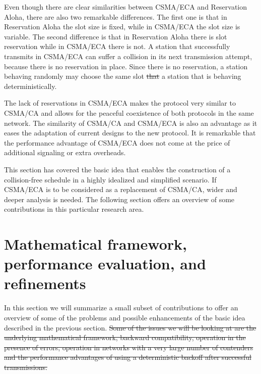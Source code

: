 \documentclass[journal]{IEEEtran}
\providecommand{\DIFadd}[1]{{\protect\color{blue}\uwave{#1}}} %
\providecommand{\DIFdel}[1]{{\protect\color{red}\sout{#1}}}                      %
\providecommand{\DIFaddbegin}{} %
\providecommand{\DIFaddend}{} %
\providecommand{\DIFdelbegin}{} %
\providecommand{\DIFdelend}{} %
\begin{document}

Even though there are clear similarities between CSMA/ECA and Reservation Aloha, there are also two remarkable differences.
The first one is that in Reservation Aloha the slot size is fixed, while in CSMA/ECA the slot size is variable.
The second difference is that in Reservation Aloha there is slot reservation while in CSMA/ECA there is not.
A station that successfully transmits in CSMA/ECA can suffer a collision in its next transmission attempt, because there is no reservation in place.
Since there is no reservation, a station behaving randomly may choose the same slot \DIFdelbegin \DIFdel{that }\DIFdelend \DIFaddbegin \DIFadd{as }\DIFaddend a station that is behaving deterministically.

The lack of reservations in CSMA/ECA makes the protocol very similar to CSMA/CA and allows for the peaceful coexistence of both protocols in the same network.
The similarity of CSMA/CA and CSMA/ECA is also an advantage as it eases the adaptation of current designs to the new protocol.
It is remarkable that the performance advantage of CSMA/ECA does not come at the price of additional signaling or extra overheads.


This section has covered the basic idea that enables the construction of a collision-free schedule in a highly idealized and simplified scenario. If CSMA/ECA is to be considered as a replacement of CSMA/CA, wider and deeper analysis is needed. The following section offers an overview of some contributions in this particular research area.

\section{Mathematical framework, performance evaluation, and refinements}
\label{sec:survey}
In this section we will summarize a small subset of \DIFaddbegin \DIFadd{representative }\DIFaddend contributions to offer an overview of some of the problems and possible enhancements of the basic idea described in the previous section. 
\DIFdelbegin \DIFdel{Some of the issues we will be looking at are the underlying mathematical framework, backward compatibility, operation in the presence of errors, operation in networks with a very large number of contenders and the performance advantages of using a deterministic backoff after successful transmissions. 
}\DIFdelend %
\end{document}
